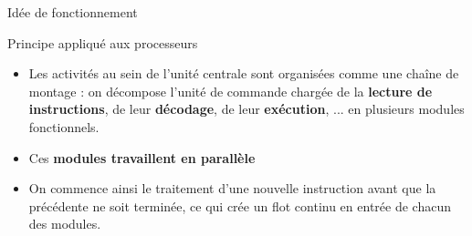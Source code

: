 %
\begin{Frame}{Idée de fonctionnement}

\begin{block}{Principe appliqué aux processeurs}
  \begin{center}
 	\begin{itemize}
    \item Les activités au sein de l'unité centrale sont organisées
      comme une chaîne de montage : on décompose l'unité de commande
      chargée de la \textbf{lecture de instructions}, de leur
      \textbf{décodage}, de leur \textbf{exécution}, ... en plusieurs
      modules fonctionnels.
	\item Ces \textbf{modules travaillent en parallèle}
	\item On commence ainsi le traitement d'une nouvelle instruction
      avant que la précédente ne soit terminée, ce qui crée un flot
      continu en entrée de chacun des modules.
    \end{itemize}
  \end{center}
\end{block}   
\end{Frame}


